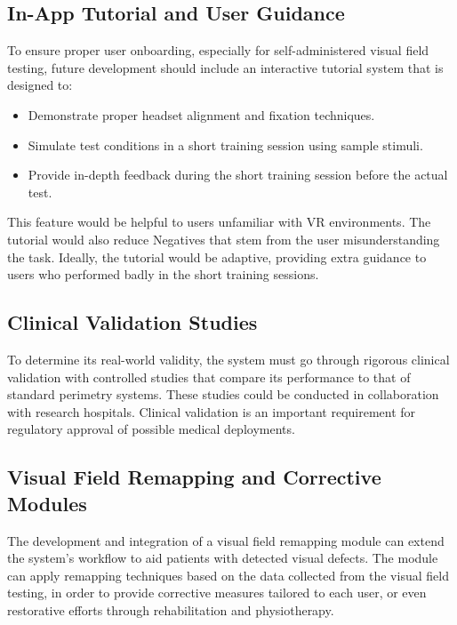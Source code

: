 \documentclass{l4proj}
\begin{document}
\subsection{In-App Tutorial and User Guidance}
To ensure proper user onboarding, especially for self-administered visual field testing, future development should include an interactive tutorial system that is designed to:

\begin{itemize}
    \item Demonstrate proper headset alignment and fixation techniques.
    \item Simulate test conditions in a short training session using sample stimuli.
    \item Provide in-depth feedback during the short training session before the actual test.
\end{itemize}

This feature would be helpful to users unfamiliar with VR environments. The tutorial would also reduce Negatives that stem from the user misunderstanding the task. Ideally, the tutorial would be adaptive, providing extra guidance to users who performed badly in the short training sessions.

\subsection{Clinical Validation Studies}
To determine its real-world validity, the system must go through rigorous clinical validation with controlled studies that compare its performance to that of standard perimetry systems. These studies could be conducted in collaboration with research hospitals. Clinical validation is an important requirement for regulatory approval of possible medical deployments. 

\subsection{Visual Field Remapping and Corrective Modules}
The development and integration of a visual field remapping module can extend the system's workflow to aid patients with detected visual defects. The module can apply remapping techniques based on the data collected from the visual field testing, in order to provide corrective measures tailored to each user, or even restorative efforts through rehabilitation and physiotherapy.



%
% 
\end{document}
